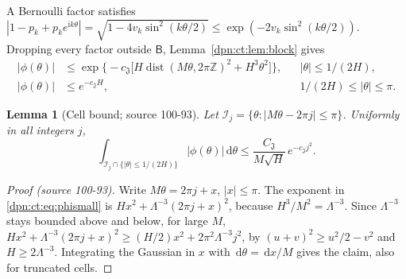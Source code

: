 \documentclass[11pt]{article}
\numberwithin{equation}{section}
\newtheorem{lemma}[theorem]{Lemma}
\theoremstyle{definition}\newtheorem{definition}[theorem]{Definition}
\theoremstyle{remark}\newtheorem{remark}[theorem]{Remark}
\newcommand{\dd}{\,\mathrm d}\newcommand{\ii}{\mathrm i}
\newcommand{\src}[1]{\textup{(source #1)}}
\begin{document}
A Bernoulli factor satisfies
$|1-p_k+p_ke^{\ii k\theta}|=\sqrt{1-4v_k\sin^2(k\theta/2)}\le\exp(-2v_k\sin^2(k\theta/2))$.
Dropping every factor outside $\mathsf B$, Lemma~\ref{dpn:ct:lem:block} gives
\begin{align}
 |\phi(\theta)|&\le\exp\bigl\{-c_{\mathfrak J}\bigl[H\operatorname{dist}(M\theta,2\pi\mathbb Z)^2
   +H^3\theta^2\bigr]\bigr\},&&|\theta|\le1/(2H),\label{dpn:ct:eq:phismall}\\
 |\phi(\theta)|&\le e^{-c_{\mathfrak J}H},&&1/(2H)\le|\theta|\le\pi.\label{dpn:ct:eq:philarge}
\end{align}

\begin{lemma}[Cell bound; source 100-93]\label{dpn:ct:lem:integrated}
Let $\mathcal I_j=\{\theta:|M\theta-2\pi j|\le\pi\}$.  Uniformly in all
integers $j$,
\begin{equation}\label{dpn:ct:eq:cellbound}
 \int_{\mathcal I_j\cap\{|\theta|\le1/(2H)\}}|\phi(\theta)|\dd\theta
 \le\frac{C_{\mathfrak J}}{M\sqrt H}\,e^{-c_{\mathfrak J}j^2}.
\end{equation}
\end{lemma}
\begin{proof}[Proof \src{100-93}]
Write $M\theta=2\pi j+x$, $|x|\le\pi$.  The exponent in \eqref{dpn:ct:eq:phismall}
is $Hx^2+\Lambda^{-3}(2\pi j+x)^2$, because $H^3/M^2=\Lambda^{-3}$.  Since
$\Lambda^{-3}$ stays bounded above and below, for large $M$,
$Hx^2+\Lambda^{-3}(2\pi j+x)^2\ge(H/2)x^2+2\pi^2\Lambda^{-3}j^2$, by
$(u+v)^2\ge u^2/2-v^2$ and $H\ge2\Lambda^{-3}$.  Integrating the Gaussian in $x$
with $\dd\theta=\dd x/M$ gives the claim, also for truncated cells.
\end{proof}
\end{document}
